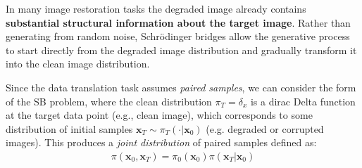 \documentclass{article}
\begin{document}
In many image restoration tasks the degraded image already contains \textbf{substantial structural information about the target image}. Rather than generating from random noise, Schrödinger bridges allow the generative process to start directly from the degraded image distribution and gradually transform it into the clean image distribution. 

Since the data translation task assumes \textit{paired samples}, we can consider the form of the SB problem, where the clean distribution $\pi_T=\delta_{x}$ is a dirac Delta function at the target data point (e.g., clean image), which corresponds to some distribution of initial samples $\boldsymbol{x}_T\sim \pi_T(\cdot|\boldsymbol{x}_0)$ (e.g. degraded or corrupted images). This produces a \textit{joint distribution} of paired samples defined as:
\begin{align}
    \pi(\boldsymbol{x}_0, \boldsymbol{x}_T)=\pi_0(\boldsymbol{x}_0)\pi(\boldsymbol{x}_T|\boldsymbol{x}_0)
\end{align}
\end{document}
